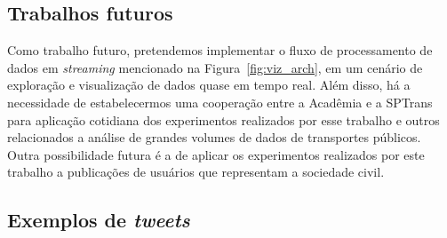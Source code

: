 \documentclass[
	12pt,				%
	oneside,			%
	a4paper,			%
	english,			%
	brazil				%
	]{abntex2ppgsi}
\begin{document}
{{{\section{Trabalhos futuros}
Como trabalho futuro, pretendemos implementar o fluxo de processamento de dados em \textit{streaming} mencionado na Figura~\ref{fig:viz_arch}, em um cenário de exploração e visualização de dados quase em tempo real.  Além disso, há a necessidade de estabelecermos uma cooperação entre a Acadêmia e a SPTrans para aplicação cotidiana dos experimentos realizados por esse trabalho e outros relacionados a análise de grandes volumes de dados de transportes públicos. Outra possibilidade futura é a de aplicar os experimentos realizados por este trabalho a publicações de usuários que representam a sociedade civil.

\postextual



%
%


\begin{apendicesenv}

\partapendices
\chapter{Exemplos de \textit{tweets}}
\label{apendiceA}


\end{apendicesenv}}}}
\end{document}
